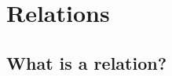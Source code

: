 \chapter{Relations}
\label{ch:relations}
\setlength{\parindent}{1em}

\section{What is a relation?}
